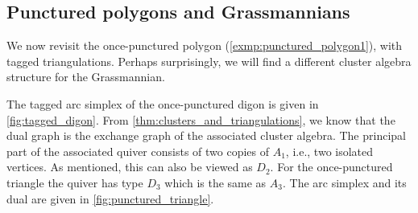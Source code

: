 \subsection{Punctured polygons and Grassmannians}

We now revisit the once-punctured polygon (\cref{exmp:punctured_polygon1}), with tagged
triangulations. Perhaps surprisingly, we will find a different cluster algebra
structure for the Grassmannian.

\medskip

The tagged arc simplex of the once-punctured digon is given in \cref{fig:tagged_digon}.
From \cref{thm:clusters_and_triangulations}, we know that the dual graph is the
exchange graph of the associated cluster algebra. The principal part of the associated
quiver consists of two copies of $A_1$, i.e., two isolated vertices. As mentioned, this
can also be viewed as $D_2$. For the once-punctured triangle the quiver has type $D_3$
which is the same as $A_3$. The arc simplex and its dual are given in
\cref{fig:punctured_triangle}.

